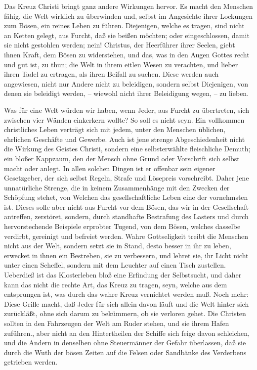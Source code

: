 Das Kreuz Christi bringt ganz andere Wirkungen hervor. Es macht den Menschen fähig, die Welt wirklich zu überwinden und, selbst im Angesichte ihrer Lockungen zum Bösen, ein reines Leben zu führen. Diejenigen, welche es tragen, sind nicht an Ketten gelegt, aus Furcht, daß sie beißen möchten; oder eingeschlossen, damit sie nicht gestohlen werden; nein! Christus, der Heerführer ihrer Seelen, giebt ihnen Kraft, dem Bösen zu widerstehen, und das, was in den Augen Gottes recht und gut ist, zu thun; die Welt in ihrem eitlen Wesen zu verachten, und lieber ihren Tadel zu ertragen, als ihren Beifall zu suchen. Diese werden auch angewiesen, nicht nur Andere nicht zu beleidigen, sondern selbst Diejenigen, von denen sie beleidigt werden, -- wiewohl nicht ihrer Beleidigung wegen, -- zu lieben.

Was für eine Welt würden wir haben, wenn Jeder, aus Furcht zu übertreten, sich zwischen vier Wänden einkerkern wollte? So soll es nicht seyn. Ein vollkommen  christliches Leben verträgt sich mit jedem, unter den Menschen üblichen, ehrlichen Geschäfte und Gewerbe. Auch ist jene strenge Abgeschiedenheit nicht die Wirkung des Geistes Christi, sondern eine selbsterwählte fleischliche Demuth; ein bloßer Kappzaum, den der Mensch ohne Grund oder Vorschrift sich selbst macht oder anlegt. In allen solchen Dingen ist er offenbar sein eigener Gesetzgeber, der sich selbst Regeln, Strafe und Lösepreis vorschreibt. Daher jene unnatürliche Strenge, die in keinem Zusammenhänge mit den Zwecken der Schöpfung stehet, von Welchen das gesellschaftliche Leben eine der vornehmsten ist. Dieses solle aber nicht aus Furcht vor dem Bösen, das wir in der Gesellschaft antreffen, zerstöret, sondern, durch standhafte Bestrafung des Lasters und durch hervorstechende Beispiele erprobter Tugend, von dem Bösen, welches dasselbe verdirbt, gereinigt und befreiet werden. Wahre Gottseligkeit treibt die Menschen nicht aus der Welt, sondern setzt sie in Stand, desto besser in ihr zu leben, erwecket in ihnen ein Bestreben, sie zu verbessern, und lehret sie, ihr Licht nicht unter einen Scheffel, sondern mit dem Leuchter auf einen Tisch zustellen. Ueberdieß ist das Klosterleben bloß eine Erfindung der Selbstsucht, und daher kann das nicht die rechte Art, das Kreuz zu tragen, seyn, welche aus dem entsprungen ist, was durch das wahre Kreuz vernichtet werden muß. Noch mehr: Diese Grille macht, daß Jeder für sich allein davon läuft und die Welt hinter sich zurückläßt, ohne sich darum zu bekümmern, ob sie verloren gehet. Die Christen sollten in den Fahrzeugen der Welt am Ruder stehen, und sie ihrem Hafen zuführen., aber nicht an den Hintertheilen der Schiffe sich feige davon schleichen, und die Andern in denselben ohne Steuermänner der Gefahr überlassen, daß sie durch die Wuth der bösen Zeiten auf die Felsen oder Sandbänke des Verderbens getrieben werden.

